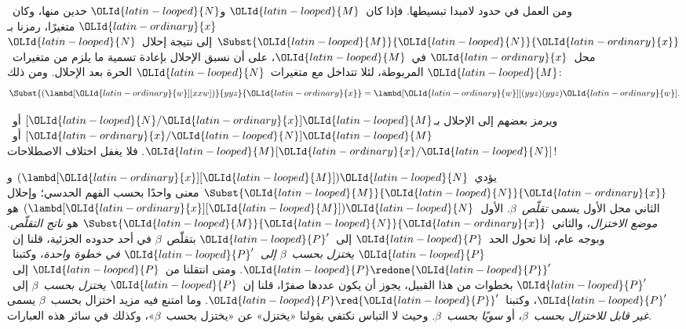 \documentclass[../../../include/open-logic-section]{subfiles}
\begin{document}

ومن العمل في حدود لامبدا تبسيطها. فإذا كان~${\OLId{latin-looped}{M}}$ و${\OLId{latin-looped}{N}}$ حدين منها،
وكان~${\OLId{latin-ordinary}{x}}$ متغيرًا، رمزنا بـ$\Subst{{\OLId{latin-looped}{M}}}{{\OLId{latin-looped}{N}}}{{\OLId{latin-ordinary}{x}}}$ إلى نتيجة إحلال~${\OLId{latin-looped}{N}}$
محل~${\OLId{latin-ordinary}{x}}$ في~${\OLId{latin-looped}{M}}$، على أن نسبق الإحلال بإعادة تسمية ما يلزم من
متغيرات~${\OLId{latin-looped}{M}}$ المربوطة، لئلا تتداخل مع متغيرات~${\OLId{latin-looped}{N}}$ الحرة بعد
الإحلال. ومن ذلك:
\[
\Subst{(\lambd[{\OLId{latin-ordinary}{w}}][xxw])}{yyz}{{\OLId{latin-ordinary}{x}}} = \lambd[{\OLId{latin-ordinary}{w}}][(yyz)(yyz){\OLId{latin-ordinary}{w}}].
\]

\begin{digress}
ويرمز بعضهم إلى الإحلال بـ$[{\OLId{latin-looped}{N}}/{\OLId{latin-ordinary}{x}}]{\OLId{latin-looped}{M}}$ أو~$[{\OLId{latin-ordinary}{x}}/{\OLId{latin-looped}{N}}]{\OLId{latin-looped}{M}}$ أو~${\OLId{latin-looped}{M}}[{\OLId{latin-ordinary}{x}}/{\OLId{latin-looped}{N}}]$.
فلا يغفل اختلاف الاصطلاحات!
\end{digress}

يؤدي~$(\lambd[{\OLId{latin-ordinary}{x}}][{\OLId{latin-looped}{M}}]){\OLId{latin-looped}{N}}$ و$\Subst{{\OLId{latin-looped}{M}}}{{\OLId{latin-looped}{N}}}{{\OLId{latin-ordinary}{x}}}$ معنى واحدًا بحسب
الفهم الحدسي؛ وإحلال الثاني محل الأول يسمى \emph{تقلّص~$\beta$}.
الأول~$(\lambd[{\OLId{latin-ordinary}{x}}][{\OLId{latin-looped}{M}}]){\OLId{latin-looped}{N}}$ هو \emph{موضع الاختزال}،
والثاني~$\Subst{{\OLId{latin-looped}{M}}}{{\OLId{latin-looped}{N}}}{{\OLId{latin-ordinary}{x}}}$ هو \emph{ناتج التقلّص}.
وبوجه عام، إذا تحول الحد~${\OLId{latin-looped}{P}}$ إلى~${\OLId{latin-looped}{P}}'$ بتقلّص~$\beta$ في
أحد حدوده الجزئية، قلنا إن~${\OLId{latin-looped}{P}}$ \emph{يختزل بحسب~$\beta$
إلى~${\OLId{latin-looped}{P}}'$ في خطوة واحدة}، وكتبنا~${\OLId{latin-looped}{P}} \redone {\OLId{latin-looped}{P}}'$.
ومتى انتقلنا من~${\OLId{latin-looped}{P}}$ إلى~${\OLId{latin-looped}{P}}'$ بخطوات من هذا القبيل،
يجوز أن يكون عددها صفرًا، قلنا إن~${\OLId{latin-looped}{P}}$ \emph{يختزل بحسب~$\beta$}
إلى~${\OLId{latin-looped}{P}}'$، وكتبنا~${\OLId{latin-looped}{P}} \red {\OLId{latin-looped}{P}}'$.
وما امتنع فيه مزيد اختزال بحسب~$\beta$ يسمى
\emph{غير قابل للاختزال بحسب~$\beta$}، أو \emph{سويًا بحسب~$\beta$}.
وحيث لا التباس نكتفي بقولنا «يختزل» عن «يختزل بحسب~$\beta$»،
وكذلك في سائر هذه العبارات.
\end{document}
